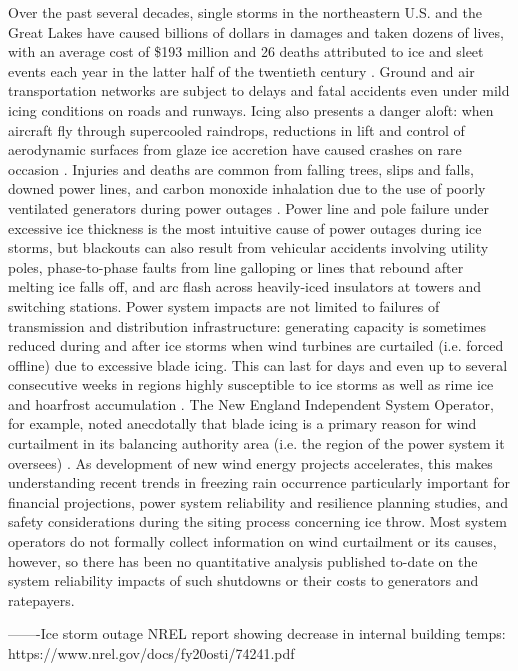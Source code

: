 \documentclass[twocol]{ametsoc}
\begin{document}
Over the past several decades, single storms in the northeastern U.S. and the Great Lakes have caused billions of dollars in damages and taken dozens of lives, with an average cost of \$193 million and 26 deaths attributed to ice and sleet events each year in the latter half of the twentieth century \citep{lott2006tracking, changnon2006severe, ncei2019storm}. Ground and air transportation networks are subject to delays and fatal accidents even under mild icing conditions on roads and runways. Icing also presents a danger aloft: when aircraft fly through supercooled raindrops, reductions in lift and control of aerodynamic surfaces from glaze ice accretion have caused crashes on rare occasion \citep{bernstein2000freezing}. Injuries and deaths are common from falling trees, slips and falls, downed power lines, and carbon monoxide inhalation due to the use of poorly ventilated generators during power outages \citep{daley2000outbreak}. Power line and pole failure under excessive ice thickness is the most intuitive cause of power outages during ice storms, but blackouts can also result from vehicular accidents involving utility poles, phase-to-phase faults from line galloping or lines that rebound after melting ice falls off, and arc flash across heavily-iced insulators at towers and switching stations. Power system impacts are not limited to failures of transmission and distribution infrastructure: generating capacity is sometimes reduced during and after ice storms when wind turbines are curtailed (i.e. forced offline) due to excessive blade icing. This can last for days and even up to several consecutive weeks in regions highly susceptible to ice storms as well as rime ice and hoarfrost accumulation \citep{davis2014forecast}. The New England Independent System Operator, for example, noted anecdotally that blade icing is a primary reason for wind curtailment in its balancing authority area (i.e. the region of the power system it oversees) \citep{bird2014wind}. As development of new wind energy projects accelerates, this makes understanding recent trends in freezing rain occurrence particularly important for financial projections, power system reliability and resilience planning studies, and safety considerations during the siting process concerning ice throw. Most system operators do not formally collect information on wind curtailment or its causes, however, so there has been no quantitative analysis published to-date on the system reliability impacts of such shutdowns or their costs to generators and ratepayers.

-------Ice storm outage NREL report showing decrease in internal building temps: https://www.nrel.gov/docs/fy20osti/74241.pdf
\end{document}
